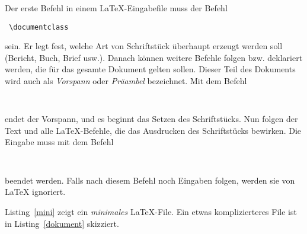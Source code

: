 Der erste Befehl in einem \LaTeX-Eingabefile muss der Befehl
\begin{lstlisting}
 \documentclass
\end{lstlisting}
sein. Er legt fest, welche Art von Schriftstück überhaupt erzeugt werden soll
(Bericht, Buch, Brief usw.). Danach können weitere Befehle folgen bzw. 
deklariert werden, die für das gesamte Dokument gelten sollen.  Dieser Teil des 
Dokuments wird auch als \emph{Vorspann} oder \emph{Präambel} bezeichnet. Mit dem
Befehl
\begin{lstlisting}
 
\end{lstlisting}
endet der Vorspann, und es beginnt das Setzen des Schriftstücks. Nun folgen der 
Text und alle \LaTeX-Befehle, die das Ausdrucken des Schriftstücks bewirken.
Die Eingabe muss mit dem Befehl
\begin{lstlisting}
 
\end{lstlisting}
beendet werden. Falls nach diesem Befehl noch Eingaben folgen, werden sie von
\LaTeX{} ignoriert.
 
Listing~\ref{mini} zeigt ein \emph{minimales} \LaTeX-File. Ein etwas 
komplizierteres File ist in Listing~\ref{dokument} skizziert.
 




